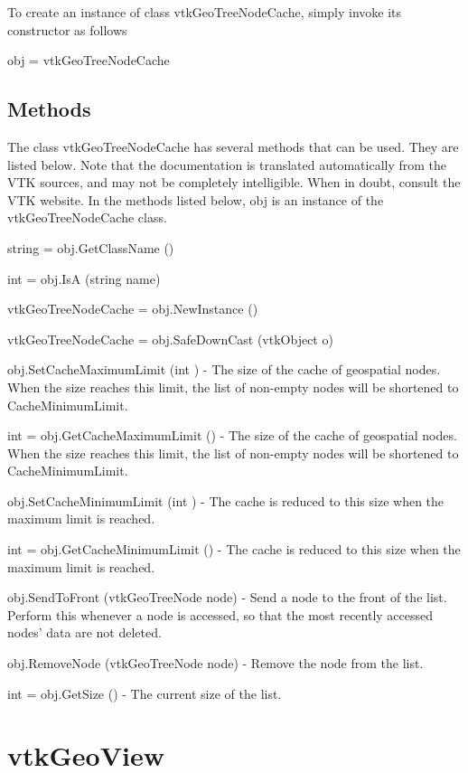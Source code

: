 To create an instance of class vtk\-Geo\-Tree\-Node\-Cache, simply invoke its constructor as follows \begin{DoxyVerb}  obj = vtkGeoTreeNodeCache
\end{DoxyVerb}
 \hypertarget{vtkwidgets_vtkxyplotwidget_Methods}{}\subsection{Methods}\label{vtkwidgets_vtkxyplotwidget_Methods}
The class vtk\-Geo\-Tree\-Node\-Cache has several methods that can be used. They are listed below. Note that the documentation is translated automatically from the V\-T\-K sources, and may not be completely intelligible. When in doubt, consult the V\-T\-K website. In the methods listed below, {\ttfamily obj} is an instance of the vtk\-Geo\-Tree\-Node\-Cache class. 
\begin{DoxyItemize}
\item {\ttfamily string = obj.\-Get\-Class\-Name ()}  
\item {\ttfamily int = obj.\-Is\-A (string name)}  
\item {\ttfamily vtk\-Geo\-Tree\-Node\-Cache = obj.\-New\-Instance ()}  
\item {\ttfamily vtk\-Geo\-Tree\-Node\-Cache = obj.\-Safe\-Down\-Cast (vtk\-Object o)}  
\item {\ttfamily obj.\-Set\-Cache\-Maximum\-Limit (int )} -\/ The size of the cache of geospatial nodes. When the size reaches this limit, the list of non-\/empty nodes will be shortened to Cache\-Minimum\-Limit.  
\item {\ttfamily int = obj.\-Get\-Cache\-Maximum\-Limit ()} -\/ The size of the cache of geospatial nodes. When the size reaches this limit, the list of non-\/empty nodes will be shortened to Cache\-Minimum\-Limit.  
\item {\ttfamily obj.\-Set\-Cache\-Minimum\-Limit (int )} -\/ The cache is reduced to this size when the maximum limit is reached.  
\item {\ttfamily int = obj.\-Get\-Cache\-Minimum\-Limit ()} -\/ The cache is reduced to this size when the maximum limit is reached.  
\item {\ttfamily obj.\-Send\-To\-Front (vtk\-Geo\-Tree\-Node node)} -\/ Send a node to the front of the list. Perform this whenever a node is accessed, so that the most recently accessed nodes' data are not deleted.  
\item {\ttfamily obj.\-Remove\-Node (vtk\-Geo\-Tree\-Node node)} -\/ Remove the node from the list.  
\item {\ttfamily int = obj.\-Get\-Size ()} -\/ The current size of the list.  
\end{DoxyItemize}\hypertarget{vtkgeovis_vtkgeoview}{}\section{vtk\-Geo\-View}\label{vtkgeovis_vtkgeoview}
